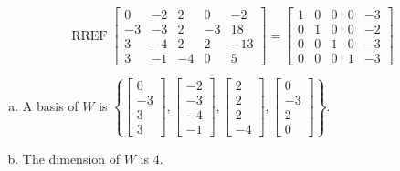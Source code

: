 \begin{exerciseAnswer} 


\[\operatorname{RREF} \left[\begin{array}{ccccc}
0 & -2 & 2 & 0 & -2 \\
-3 & -3 & 2 & -3 & 18 \\
3 & -4 & 2 & 2 & -13 \\
3 & -1 & -4 & 0 & 5
\end{array}\right] = \left[\begin{array}{ccccc}
1 & 0 & 0 & 0 & -3 \\
0 & 1 & 0 & 0 & -2 \\
0 & 0 & 1 & 0 & -3 \\
0 & 0 & 0 & 1 & -3
\end{array}\right] \]


\begin{enumerate}[(a)]
\item A basis of \(W\) is \( \left\{ \left[\begin{array}{c}
0 \\
-3 \\
3 \\
3
\end{array}\right] , \left[\begin{array}{c}
-2 \\
-3 \\
-4 \\
-1
\end{array}\right] , \left[\begin{array}{c}
2 \\
2 \\
2 \\
-4
\end{array}\right] , \left[\begin{array}{c}
0 \\
-3 \\
2 \\
0
\end{array}\right] \right\} \).
\item The dimension of \(W\) is \( 4 \).
\end{enumerate}
    
\end{exerciseAnswer}
    

